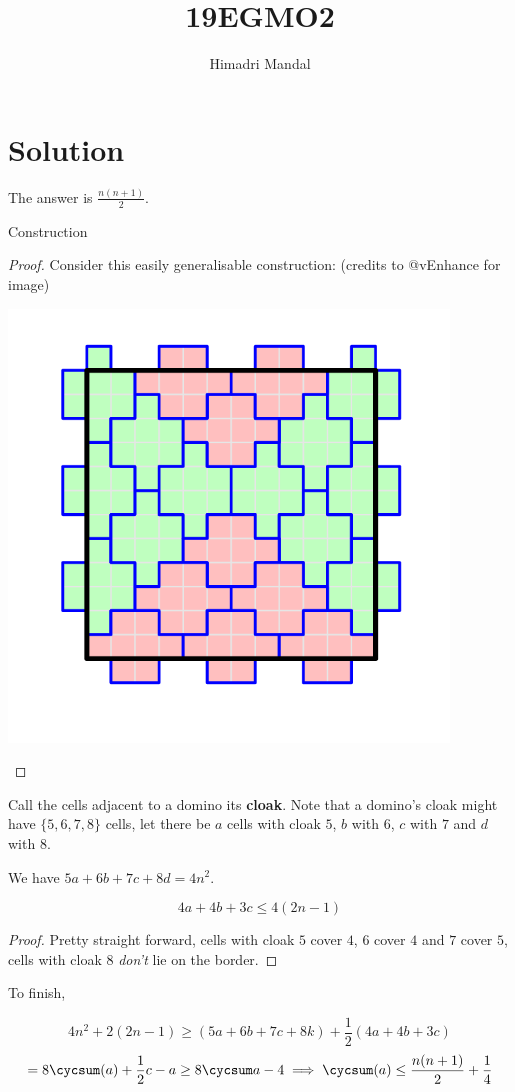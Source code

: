 \documentclass[11pt]{scrartcl}
\title{19EGMO2}
\author{Himadri Mandal}
\begin{document}
\maketitle

\section{Solution}
\begin{soln}
	
\raggedright
The answer is $\frac{n(n+1)}{2}$. 

\begin{claim}{Construction}
\end{claim}
\begin{proof}
Consider this easily generalisable construction: (credits to @vEnhance for image) 
\begin{center}
	\includegraphics[scale=0.3]{19EGMO2.jpg}
\end{center}
\end{proof}
Call the cells adjacent to a domino its \textbf{\color{red}cloak}. Note that a domino's cloak might have $\{5,6,7,8\}$ cells, let there be $a$ cells with cloak $5$, $b$ with $6$, $c$ with $7$ and $d$ with $8$.

We have $5a+6b+7c+8d = 4n^2$.

\begin{claim}
$$4a+4b+3c \leq 4(2n-1)$$
\end{claim}
\begin{proof}
	Pretty straight forward, cells with cloak $5$ cover $4$, $6$ cover $4$ and $7$ cover $5$, cells with cloak $8$ \textit{don't} lie on the border.
\end{proof}

To finish, 

$$4n^2 + 2(2n-1) \geq (5a+6b+7c+8k) + \frac12(4a+4b+3c)$$
$$= 8\cycsum(a) + \frac12 c - a \geq 8 \cycsum a - 4 \implies \cycsum(a) \leq \frac{n(n+1)}{2} + \frac14$$


\end{soln}
\end{document}
